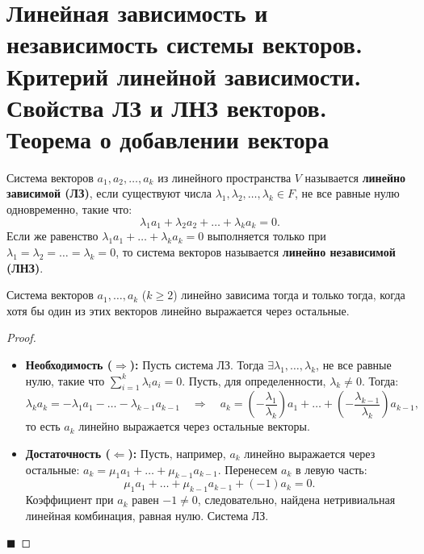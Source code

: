\section{Линейная зависимость и независимость системы векторов. Критерий линейной зависимости. Свойства ЛЗ и ЛНЗ векторов. Теорема о добавлении вектора}

\begin{definition}
Система векторов $a_1, a_2, \dots, a_k$ из линейного пространства $V$ называется \textbf{линейно зависимой (ЛЗ)}, если существуют числа $\lambda_1, \lambda_2, \dots, \lambda_k \in F$, не все равные нулю одновременно, такие что:
\[
\lambda_1 a_1 + \lambda_2 a_2 + \dots + \lambda_k a_k = 0.
\]
Если же равенство $\lambda_1 a_1 + \dots + \lambda_k a_k = 0$ выполняется только при $\lambda_1 = \lambda_2 = \dots = \lambda_k = 0$, то система векторов называется \textbf{линейно независимой (ЛНЗ)}.
\end{definition}

\begin{theorem}
Система векторов $a_1, \dots, a_k$ ($k \ge 2$) линейно зависима тогда и только тогда, когда хотя бы один из этих векторов линейно выражается через остальные.
\end{theorem}

\begin{proof}
\begin{itemize}
    \item \textbf{Необходимость ($\Rightarrow$):} Пусть система ЛЗ. Тогда $\exists \lambda_1, \dots, \lambda_k$, не все равные нулю, такие что $\sum_{i=1}^k \lambda_i a_i = 0$. Пусть, для определенности, $\lambda_k \neq 0$. Тогда:
    \[
    \lambda_k a_k = -\lambda_1 a_1 - \dots - \lambda_{k-1} a_{k-1} \quad \Rightarrow \quad a_k = \left(-\frac{\lambda_1}{\lambda_k}\right) a_1 + \dots + \left(-\frac{\lambda_{k-1}}{\lambda_k}\right) a_{k-1},
    \]
    то есть $a_k$ линейно выражается через остальные векторы.
    \item \textbf{Достаточность ($\Leftarrow$):} Пусть, например, $a_k$ линейно выражается через остальные: $a_k = \mu_1 a_1 + \dots + \mu_{k-1} a_{k-1}$. Перенесем $a_k$ в левую часть:
    \[
    \mu_1 a_1 + \dots + \mu_{k-1} a_{k-1} + (-1) a_k = 0.
    \]
    Коэффициент при $a_k$ равен $-1 \neq 0$, следовательно, найдена нетривиальная линейная комбинация, равная нулю. Система ЛЗ.
\end{itemize}
\hfill$\blacksquare$
\end{proof}


